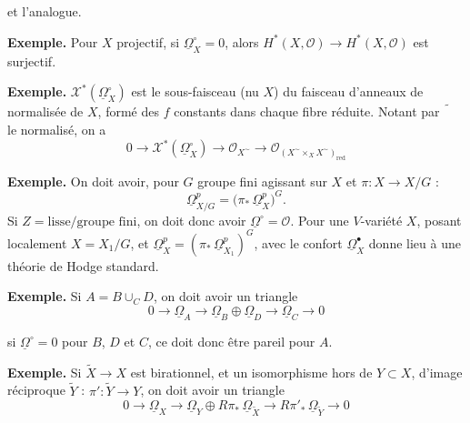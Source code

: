\documentclass[11pt,a4paper]{article}
\theoremstyle{plain}
\theoremstyle{definition}
\begin{document}
et l'analogue.

\vspace{0.5cm}

\noindent\textbf{Exemple.} Pour $X$ projectif, si $\underline{\Omega}^{\circ}_{X} = 0$, alors $H^{*}(X,\mathcal{O}) \to H^{*}(X,\mathcal{O})$ est surjectif.

\vspace{0.3cm}

\noindent\textbf{Exemple.} $\mathcal{X}^{*}(\underline{\Omega}^{\circ}_{X})$ est le sous-faisceau (nu $X$) du faisceau d'anneaux de normalis\'ee de $X$, form\'e des $f$ constants dans chaque fibre r\'eduite. Notant par $\widetilde{\phantom{X}}$ le normalis\'e, on a
\[
0 \longrightarrow \mathcal{X}^{*}(\underline{\Omega}^{\circ}_{X}) \longrightarrow \mathcal{O}_{X^{\sim}} \longrightarrow \mathcal{O}_{(X^{\sim} \times_{X} X^{\sim})_{\mathrm{red}}}
\]

\vspace{0.3cm}

\noindent\textbf{Exemple.} On doit avoir, pour $G$ groupe fini agissant sur $X$ et $\pi : X \to X/G$ :
\[
\underline{\Omega}^{p}_{X/G} = \bigl(\pi_{*}\,\underline{\Omega}^{p}_{X}\bigr)^{G}.
\]
Si $Z = \text{lisse}/\text{groupe fini}$, on doit donc avoir $\underline{\Omega}^{\circ} = \mathcal{O}$. Pour une $V$-vari\'et\'e $X$, posant localement $X = X_{1}/G$, et $\underline{\Omega}^{p}_{X} = (\pi_{*}\,\underline{\Omega}^{p}_{X_{1}})^{G}$, avec le confort $\underline{\Omega}^{\bullet}_{X}$ donne lieu \`a une th\'eorie de Hodge standard.

\vspace{0.3cm}

\noindent\textbf{Exemple.} Si $A = B \cup_{C} D$, on doit avoir un triangle
\[
0 \longrightarrow \underline{\Omega}_{A} \longrightarrow \underline{\Omega}_{B} \oplus \underline{\Omega}_{D} \longrightarrow \underline{\Omega}_{C} \longrightarrow 0
\]

\newpage

si $\underline{\Omega}^{\circ} = 0$ pour $B$, $D$ et $C$, ce doit donc \^etre pareil pour $A$.

\vspace{0.3cm}

\noindent\textbf{Exemple.} Si $\widetilde{X} \to X$ est birationnel, et un isomorphisme hors de $Y \subset X$, d'image r\'eciproque $\widetilde{Y}$ : $\pi' : \widetilde{Y} \to Y$, on doit avoir un triangle
\[
0 \longrightarrow \underline{\Omega}_{X} \longrightarrow \underline{\Omega}_{Y} \oplus R\pi_{*}\,\underline{\Omega}_{\widetilde{X}} \longrightarrow R\pi'_{*}\,\underline{\Omega}_{\widetilde{Y}} \longrightarrow 0
\]
\end{document}
